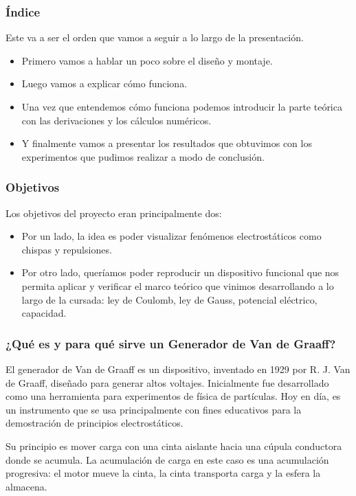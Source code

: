 \documentclass[12pt]{article}
\begin{document}
\subsubsection*{Índice}
Este va a ser el orden que vamos a seguir a lo largo de la presentación.
\begin{itemize}
  \item Primero vamos a hablar un poco sobre el diseño y montaje.

  \item Luego vamos a explicar cómo funciona.

  \item Una vez que entendemos cómo funciona podemos introducir la parte teórica con las derivaciones y los cálculos numéricos.

  \item Y finalmente vamos a presentar los resultados que obtuvimos con los experimentos que pudimos realizar a modo de conclusión.
\end{itemize}

\subsubsection*{Objetivos}
Los objetivos del proyecto eran principalmente dos:
\begin{itemize}
  \item Por un lado, la idea es poder visualizar fenómenos electrostáticos como chispas y repulsiones.

  \item Por otro lado, queríamos poder reproducir un dispositivo funcional que nos permita aplicar y verificar el marco teórico que vinimos desarrollando a lo largo de la cursada: ley de Coulomb, ley de Gauss, potencial eléctrico, capacidad.
\end{itemize}

\subsubsection*{¿Qué es y para qué sirve un Generador de Van de Graaff?}
El generador de Van de Graaff es un dispositivo, inventado en 1929 por R. J. Van de Graaff, diseñado para generar altos voltajes. Inicialmente fue desarrollado como una herramienta para experimentos de física de partículas. Hoy en día, es un instrumento que se usa principalmente con fines educativos para la demostración de principios electrostáticos.

Su principio es mover carga con una cinta aislante hacia una cúpula conductora donde se acumula. La acumulación de carga en este caso es una acumulación progresiva: el motor mueve la cinta, la cinta transporta carga y la esfera la almacena.
\end{document}
